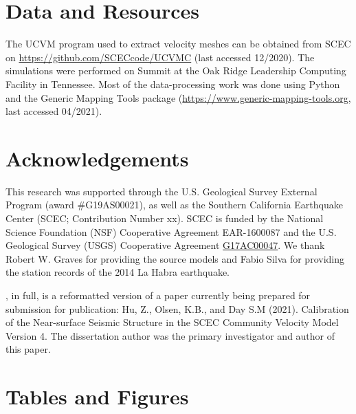 

\section*{Data and Resources}
The UCVM program used to extract velocity meshes can be obtained from SCEC on \url{https://github.com/SCECcode/UCVMC} (last accessed 12/2020). The simulations were performed on Summit at the Oak Ridge Leadership Computing Facility in Tennessee. Most of the data-processing work was done using Python and the Generic Mapping Tools package (\url{https://www.generic-mapping-tools.org}, last accessed 04/2021).


\section*{Acknowledgements}

This research was supported through the U.S. Geological Survey External Program (award \#G19AS00021), as well as the Southern California Earthquake Center (SCEC; Contribution Number xx). SCEC is funded by the National Science Foundation (NSF) Cooperative Agreement EAR-1600087 and the U.S. Geological Survey (USGS) Cooperative Agreement \url{G17AC00047}. We thank Robert W. Graves for providing the source models and Fabio Silva for providing the station records of the 2014 La Habra earthquake.

, in full, is a reformatted version of a paper currently being prepared for submission for publication: Hu, Z., Olsen, K.B., and Day S.M (2021). Calibration of the Near-surface Seismic Structure in the SCEC Community Velocity Model Version 4.
The dissertation author was the primary investigator and author of this paper.


\newpage
\section*{Tables and Figures}
%



